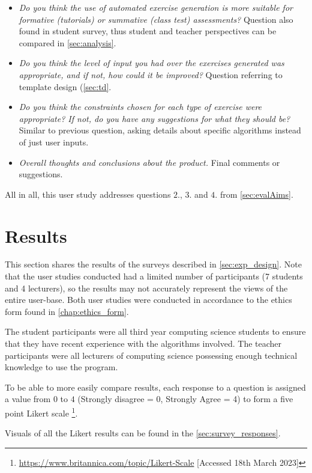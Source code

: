 \documentclass{l4proj}
\begin{document}
\begin{itemize}
	\item
	\emph{Do you think the use of automated exercise generation is more suitable for formative (tutorials) or summative (class test) assessments?} Question also found in student survey, thus student and teacher perspectives can be compared in \autoref{sec:analysis}. 
	\item
	\emph{Do you think the level of input you had over the exercises generated was appropriate, and if not, how could it be improved?} Question referring to template design (\autoref{sec:td}.
	\item
	\emph{Do you think the constraints chosen for each type of exercise were appropriate? If not, do you have any suggestions for what they should be?} Similar to previous question, asking details about specific algorithms instead of just user inputs.
	\item
	\emph{Overall thoughts and conclusions about the product.} Final comments or suggestions.
\end{itemize}

All in all, this user study addresses questions $2.$, $3.$ and $4.$ from \autoref{sec:evalAims}.

\section{Results}
\label{sec:results}

This section shares the results of the surveys described in \autoref{sec:exp_design}. Note that the user studies conducted had a limited number of participants (7 students and 4 lecturers), so the results may not accurately represent the views of the entire user-base. Both user studies were conducted in accordance to the ethics form found in \autoref{chap:ethics_form}.

The student participants were all third year computing science students to ensure that they have recent experience with the algorithms involved. The teacher participants were all lecturers of computing science possessing enough technical knowledge to use the program.

To be able to more easily compare results, each response to a question is assigned a value from $0$ to $4$ (Strongly disagree = 0, Strongly Agree = 4) to form a five point Likert scale \footnote{\url{https://www.britannica.com/topic/Likert-Scale} [Accessed 18th March 2023]}.

Visuals of all the Likert results can be found in the \autoref{sec:survey_responses}.
\end{document}
